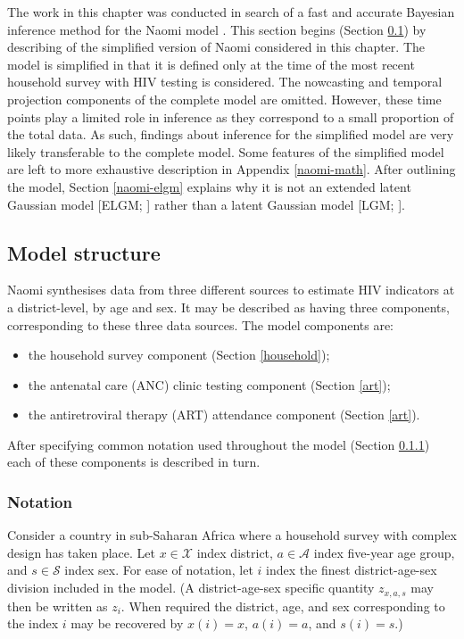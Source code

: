 \documentclass[a4paper, nobind]{templates/ociamthesis}
\providecommand{\tightlist}{%
  \setlength{\itemsep}{0pt}\setlength{\parskip}{0pt}}
\begin{document}
The work in this chapter was conducted in search of a fast and accurate Bayesian inference method for the Naomi model \autocite{eaton2021naomi}.
This section begins (Section \ref{naomi-model}) by describing of the simplified version of Naomi considered in this chapter.
The model is simplified in that it is defined only at the time of the most recent household survey with HIV testing is considered.
The nowcasting and temporal projection components of the complete model are omitted.
However, these time points play a limited role in inference as they correspond to a small proportion of the total data.
As such, findings about inference for the simplified model are very likely transferable to the complete model.
Some features of the simplified model are left to more exhaustive description in Appendix \ref{naomi-math}.
After outlining the model, Section \ref{naomi-elgm} explains why it is not an extended latent Gaussian model {[}ELGM; \textcite{stringer2022fast}{]} rather than a latent Gaussian model {[}LGM; \textcite{rue2009approximate}{]}.

\hypertarget{naomi-model}{%
\subsection{Model structure}\label{naomi-model}}

Naomi synthesises data from three different sources to estimate HIV indicators at a district-level, by age and sex.
It may be described as having three components, corresponding to these three data sources.
The model components are:

\begin{itemize}
\tightlist
\item
  the household survey component (Section \ref{household});
\item
  the antenatal care (ANC) clinic testing component (Section \ref{art});
\item
  the antiretroviral therapy (ART) attendance component (Section \ref{art}).
\end{itemize}

After specifying common notation used throughout the model (Section \ref{notation}) each of these components is described in turn.

\hypertarget{notation}{%
\subsubsection{Notation}\label{notation}}

Consider a country in sub-Saharan Africa where a household survey with complex design has taken place.
Let \(x \in \mathcal{X}\) index district, \(a \in \mathcal{A}\) index five-year age group, and \(s \in \mathcal{S}\) index sex.
For ease of notation, let \(i\) index the finest district-age-sex division included in the model.
(A district-age-sex specific quantity \(z_{x,a,s}\) may then be written as \(z_i\).
When required the district, age, and sex corresponding to the index \(i\) may be recovered by \(x(i) = x\), \(a(i) = a\), and \(s(i) = s\).)
\end{document}
